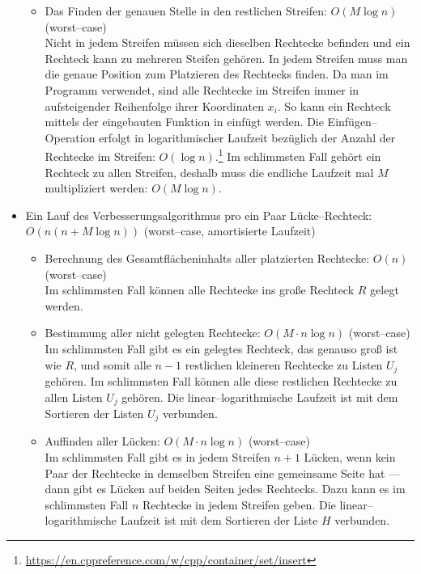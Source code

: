 \begin{itemize}
\begin{itemize}
		\item Das Finden der genauen Stelle in den restlichen Streifen: $O(M \log n)$ (worst--case)\\
		Nicht in jedem Streifen müssen sich dieselben Rechtecke befinden und ein Rechteck 
		kann zu mehreren Steifen gehören.
		In jedem Streifen muss man die genaue Position zum Platzieren des Rechtecks finden.
		Da man im Programm  verwendet, sind alle Rechtecke im Streifen
		immer in aufsteigender Reihenfolge ihrer Koordinaten $x_i$. 
		So kann ein Rechteck mittels der eingebauten Funktion  
		in  einfügt werden. Die Einfügen--Operation erfolgt in logarithmischer Laufzeit
		bezüglich der Anzahl der Rechtecke im Streifen: $O(\log n)$.\footnote{
		\href{https://en.cppreference.com/w/cpp/container/set/insert}{https://en.cppreference.com/w/cpp/container/set/insert}}
		Im schlimmsten Fall gehört ein Rechteck zu allen Streifen, deshalb muss die endliche Laufzeit
		mal $M$ multipliziert werden: $O(M \log n)$.


	\end{itemize}

	\item Ein Lauf des Verbesserungsalgorithmus pro ein Paar Lücke--Rechteck: $O(n(n + M \log n))$ (worst--case, amortisierte Laufzeit)

	\begin{itemize}
		\item Berechnung des Gesamtflächeninhalts aller platzierten Rechtecke: $O(n)$ (worst--case)\\
		Im schlimmsten Fall können alle Rechtecke ins große Rechteck $R$ gelegt werden.

		\item Bestimmung aller nicht gelegten Rechtecke: $O(M \cdot n \log n)$ (worst--case)\\
		Im schlimmsten Fall gibt es ein gelegtes Rechteck, das genauso groß ist wie $R$, und somit
		alle $n-1$ restlichen kleineren Rechtecke zu Listen $U_j$ gehören. 
		Im schlimmsten Fall können alle diese restlichen Rechtecke zu allen Listen $U_j$ gehören.
		Die linear--logarithmische Laufzeit ist mit dem Sortieren der Listen $U_j$ verbunden.

		\item Auffinden aller Lücken: $O(M \cdot n \log n)$ (worst--case)\\
		Im schlimmsten Fall gibt es in jedem Streifen $n+1$ Lücken, wenn kein Paar
		der Rechtecke in demselben Streifen eine gemeinsame Seite hat ---
		dann gibt es Lücken auf beiden Seiten
		jedes Rechtecks. Dazu kann es im schlimmsten Fall $n$ Rechtecke in jedem Streifen geben.
		Die linear--logarithmische Laufzeit ist mit dem Sortieren der Liste $H$ verbunden.


\end{itemize}
\end{itemize}
